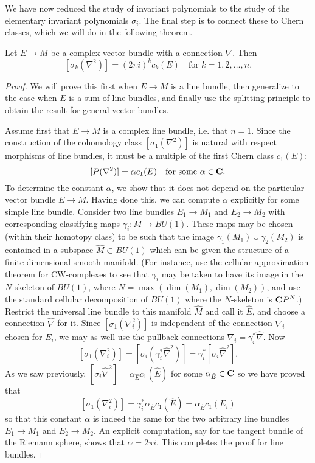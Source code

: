 \documentclass[a4paper,openany]{scrbook}
\begin{document}
We have now reduced the study of invariant polynomials to the study of the elementary invariant polynomials $\sigma_i$. The final step is to connect these to Chern classes, which we will do in the following theorem.

\begin{thm}
\label{thm:sym-polynomial-chern}
Let $E \to M$ be a complex vector bundle with a connection $\nabla$. Then
\[[\sigma_k(\nabla^2)] = (2\pi i)^kc_k(E) \quad \text{for } k = 1, 2, \ldots, n.\]
\begin{proof}
We will prove this first when $E \to M$ is a line bundle, then generalize to the case when $E$ is a sum of line bundles, and finally use the splitting principle to obtain the result for general vector bundles.

Assume first that $E \to M$ is a complex line bundle, i.e. that $n = 1$. Since the construction of the cohomology class $[\sigma_1(\nabla^2)]$ is natural with respect morphisms of line bundles, it must be a multiple of the first Chern class $c_1(E)$:
\[[P(\nabla^2)] = \alpha c_1(E) \quad\text{for some } \alpha \in \mathbf C.\]
To determine the constant $\alpha$, we show that it does not depend on the particular vector bundle $E \to M$. Having done this, we can compute $\alpha$ explicitly for some simple line bundle. Consider two line bundles $E_1 \to M_1$ and $E_2 \to M_2$ with corresponding classifying maps $\gamma_i \colon M \to BU(1)$. These maps may be chosen (within their homotopy class) to be such that the image $\gamma_1(M_1) \cup \gamma_2(M_2)$ is contained in a subspace $\hat M \subset BU(1)$ which can be given the structure of a finite-dimensional smooth manifold. (For instance, use the cellular approximation theorem for CW-complexes to see that $\gamma_i$ may be taken to have its image in the $N$-skeleton of $BU(1)$, where $N = \max(\dim(M_1), \dim(M_2))$, and use the standard cellular decomposition of $BU(1)$ where the $N$-skeleton is $\mathbf C P^N$.) Restrict the universal line bundle to this manifold $\hat M$ and call it $\hat E$, and choose a connection $\hat \nabla$ for it. Since $[\sigma_1(\nabla_i^2)]$ is independent of the connection $\nabla_i$ chosen for $E_i$, we may as well use the pullback connections $\nabla_i = \gamma_i^* \hat \nabla$. Now
\[[\sigma_1(\nabla_i^2)] = [\sigma_i(\gamma_i^* \hat \nabla^2)] = \gamma_i^* [\sigma_i \hat \nabla^2].\]
As we saw previously, $[\sigma_i \hat \nabla^2] = \alpha_{\hat E} c_1(\hat E)$ for some $\alpha_{\hat E} \in \mathbf C$ so we have proved that
\[[\sigma_1(\nabla_i^2)] = \gamma_i^* \alpha_{\hat E} c_1(\hat E) = \alpha_{\hat E} c_1(E_i)\]
so that this constant $\alpha$ is indeed the same for the two arbitrary line bundles $E_1 \to M_1$ and $E_2 \to M_2$. An explicit computation, say for the tangent bundle of the Riemann sphere, shows that $\alpha = 2\pi i$. This completes the proof for line bundles.


\end{proof}
\end{thm}
\end{document}

